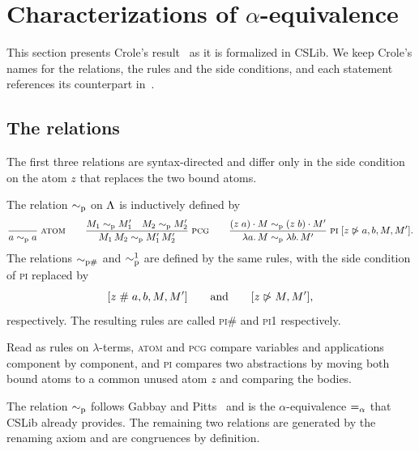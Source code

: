 \section{Characterizations of \texorpdfstring{$\alpha$}{α}-equivalence}
\label{sec:alpha-equivalences}

This section presents Crole's result~\cite{crole2012a} as it is
formalized in CSLib. We keep Crole's names for the relations, the rules
and the side conditions, and each statement references its counterpart
in~\cite{crole2012a}.

\subsection{The relations}
\label{subsec:five-definitions}

The first three relations are syntax-directed and differ only in the
side condition on the atom $z$ that replaces the two bound atoms.

\begin{definition}
\label{def:simp}
The relation $\simp$
on $\Lam$ is inductively defined by
\begin{gather*}
  \infrule{atom}{}{a \simp a}
  \qquad
  \infrule{pcg}{M_1 \simp M_1' \quad M_2 \simp M_2'}
               {M_1\, M_2 \simp M_1'\, M_2'}
  \qquad
  \infrule{pi}{\sw{z}{a} \act M \simp \sw{z}{b} \act M'}
              {\lam{a}{M} \simp \lam{b}{M'}}
  \; [z \nocc a, b, M, M'].
\end{gather*}
The relations $\simpf$
and $\simpi{1}$
are defined by the same rules, with the side condition of \textsc{pi}
replaced by
\[
  [z \fresh a, b, M, M']
  \qquad\text{and}\qquad
  [z \nocc M, M'],
\]
respectively. The resulting rules are called \textsc{pi\#} and \textsc{pi1} respectively.
\end{definition}

Read as rules on $\lambda$-terms, \textsc{atom} and \textsc{pcg} compare
variables and applications component by component, and \textsc{pi}
compares two abstractions by moving both bound atoms to a common unused
atom $z$ and comparing the bodies.

The relation $\simp$ follows Gabbay and Pitts~\cite{gabbay2002a} and
is the $\alpha$-equivalence $\alphaeq$ that CSLib already provides. The remaining two relations
are generated by the renaming axiom and are congruences by
definition.

